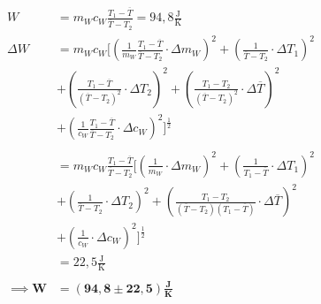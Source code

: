 \documentclass{article}
\begin{document}
\begin{equation}
    \begin{split}
        W &= m_W c_W \frac{T_1 - \overline{T}}{\overline{T} - T_2} = 94,8 \frac{\text{J}}{\text{K}} \\
        \Delta W &= m_W c_W \Biggl[ \left( \frac{1}{m_W} \frac{T_1 - \overline{T}}{\overline{T} - T_2} \cdot \Delta m_W \right)^2 + \left( \frac{1}{\overline{T} - T_2} \cdot \Delta T_1 \right)^2 \\
        &+ \left( \frac{T_1 - \overline{T}}{(\overline{T} - T_2)^2} \cdot \Delta T_2 \right)^2 + \left( \frac{T_1 - T_2}{(\overline{T} - T_2)^2} \cdot \Delta \overline{T} \right)^2 \\
        &+ \left( \frac{1}{c_W} \frac{T_1 - \overline{T}}{\overline{T} - T_2} \cdot \Delta c_W \right)^2 \Biggr]^{\frac{1}{2}} \\ \\
        &= m_W c_W \frac{T_1 - \overline{T}}{\overline{T} - T_2} \Biggl[ \left( \frac{1}{m_W} \cdot \Delta m_W \right)^2 + \left( \frac{1}{T_1 - \overline{T}} \cdot \Delta T_1 \right)^2 \\
        &+ \left( \frac{1}{\overline{T} - T_2} \cdot \Delta T_2 \right)^2 + \left( \frac{T_1 - T_2}{(\overline{T} - T_2)(T_1 - \overline{T})} \cdot \Delta \overline{T} \right)^2 \\
        &+ \left( \frac{1}{c_W} \cdot \Delta c_W \right)^2 \Biggr]^{\frac{1}{2}} \\
        &= 22,5\frac{\text{J}}{\text{K}} \\ \\
        \implies \bm{W} &= \bm{(94,8 \pm 22,5)} \frac{\textbf{J}}{\textbf{K}}
    \end{split}
\end{equation}
\end{document}
